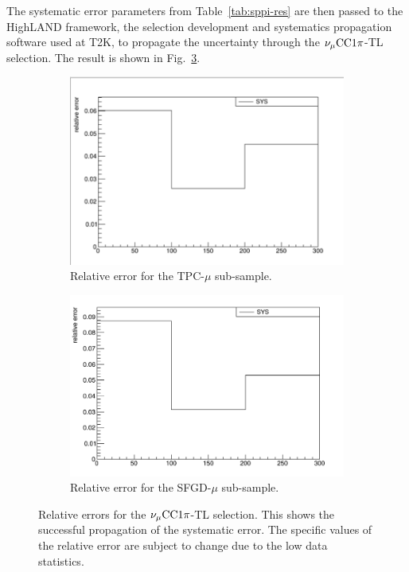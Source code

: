           The systematic error parameters from Table~\ref{tab:sppi-res} are then passed to the HighLAND framework, the selection development and systematics propagation software used at T2K, to propagate the uncertainty through the $\nu_{\mu}\textrm{CC}1\pi$-TL selection.
          The result is shown in Fig.~\ref{fig:tlpi-relerr}.
          \begin{figure}[ht]
          \centering
          \begin{subfigure}{\dbfigwid\textwidth}
          \centering
          \includegraphics[width=\textwidth]{figures/sel/relerr-tpcmu.png}
          \caption{Relative error for the TPC-$\mu$ sub-sample.}
          \label{subfig:relerr-tpcmu}
          \end{subfigure}
          \hfill
          \begin{subfigure}{\dbfigwid\textwidth}
          \centering
          \includegraphics[width=\textwidth]{figures/sel/relerr-sfgmu.png}
          \caption{Relative error for the SFGD-$\mu$ sub-sample.}
          \label{subfig:relerr-sfgmu}
          \end{subfigure}
          \caption{Relative errors for the $\nu_{\mu}\textrm{CC}1\pi$-TL selection. This shows the successful propagation of the systematic error. The specific values of the relative error are subject to change due to the low data statistics.}
          \label{fig:tlpi-relerr}  
          \end{figure}
